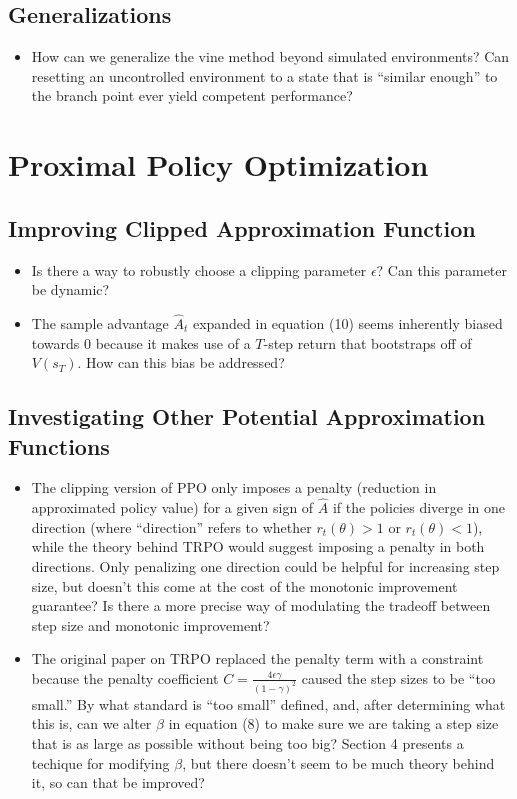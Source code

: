 \documentclass[a4paper]{article}
\begin{document}
\subsection*{Generalizations}
\begin{itemize}
    \item How can we generalize the vine method beyond simulated environments?
        Can resetting an uncontrolled environment to a state that is ``similar
        enough'' to the branch point ever yield competent performance?
\end{itemize}
\newpage
\section*{Proximal Policy Optimization}
\subsection*{Improving Clipped Approximation Function}
\begin{itemize}
    \item Is there a way to robustly choose a clipping parameter $\epsilon$?
        Can this parameter be dynamic?
    \item The sample advantage $\hat{A}_t$ expanded in equation (10) seems
        inherently biased towards 0 because it makes use of a $T$-step return
        that bootstraps off of $V(s_T)$. How can this bias be addressed?
\end{itemize}
\subsection*{Investigating Other Potential Approximation Functions}
\begin{itemize}
    \item The clipping version of PPO only imposes a penalty (reduction in
        approximated policy value) for a given sign of $\hat{A}$ if the
        policies diverge in one direction (where ``direction'' refers to
        whether $r_t(\theta) > 1$ or $r_t(\theta) < 1$), while the theory
        behind TRPO would suggest imposing a penalty in both directions. Only
        penalizing one direction could be helpful for increasing step size, but
        doesn't this come at the cost of the monotonic improvement guarantee?
        Is there a more precise way of modulating the tradeoff between step
        size and monotonic improvement?
    \item The original paper on TRPO replaced the penalty term with a
        constraint because the penalty coefficient $C = \frac{4\epsilon
        \gamma}{(1 - \gamma)^2}$ caused the step sizes to be ``too small.'' By
        what standard is ``too small'' defined, and, after determining what
        this is, can we alter $\beta$ in equation (8) to make sure we are
        taking a step size that is as large as possible without being too big?
        Section 4 presents a techique for modifying $\beta$, but there doesn't
        seem to be much theory behind it, so can that be improved?
\end{itemize}
\end{document}
